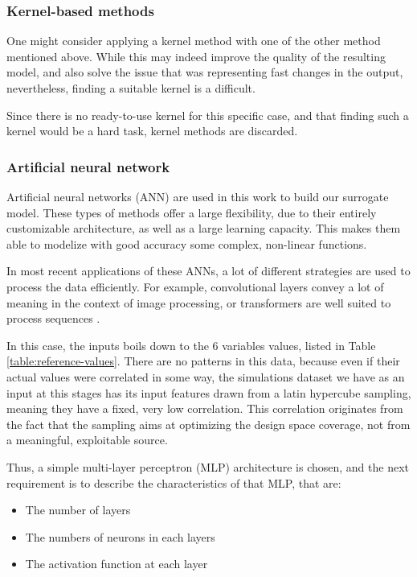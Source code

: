 
\subsubsection{Kernel-based methods\label{section:kernel-methods}}

One might consider applying a kernel method with one of the other method mentioned above. While this may indeed improve the quality of the resulting model, and also solve the issue that was representing fast changes in the output, nevertheless, finding a suitable kernel is a difficult.

Since there is no ready-to-use kernel for this specific case, and that finding such a kernel would be a hard task, kernel methods are discarded.

\subsubsection{Artificial neural network}

Artificial neural networks (ANN) are used in this work to build our surrogate model. These types of methods offer a large flexibility, due to their entirely customizable architecture, as well as a large learning capacity. This makes them able to modelize with good accuracy some complex, non-linear functions.

In most recent applications of these ANNs, a lot of different strategies are used to process the data efficiently. For example, convolutional layers convey a lot of meaning in the context of image processing, or transformers are well suited to process sequences \cite{deep-learning-class}.

In this case, the inputs boils down to the 6 variables values, listed in Table \ref{table:reference-values}. There are no patterns in this data, because even if their actual values were correlated in some way, the simulations dataset we have as an input at this stages has its input features drawn from a latin hypercube sampling, meaning they have a fixed, very low correlation. This correlation originates from the fact that the sampling aims at optimizing the design space coverage, not from a meaningful, exploitable source.

Thus, a simple multi-layer perceptron (MLP) architecture is chosen, and the next requirement is to describe the characteristics of that MLP, that are:
\begin{itemize}
    \item The number of layers
    \item The numbers of neurons in each layers
    \item The activation function at each layer
\end{itemize}

